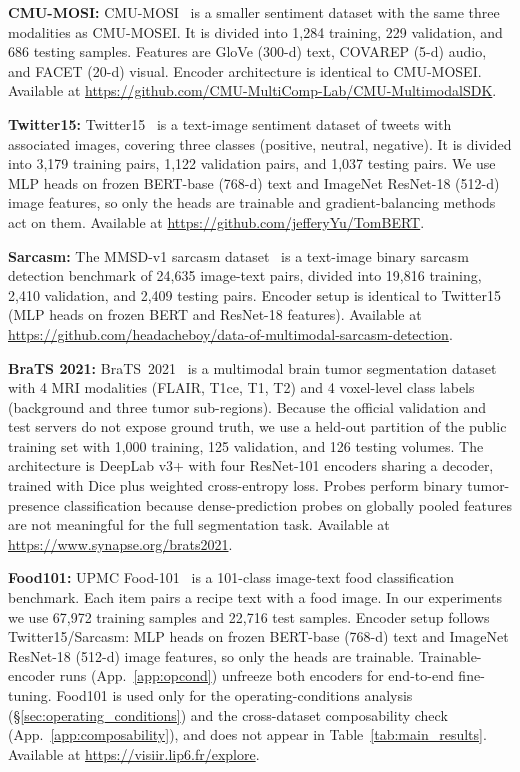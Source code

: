 \documentclass{article} %
\begin{document}
\noindent\textbf{CMU-MOSI:} CMU-MOSI~\citep{zadeh2016mosi} is a smaller sentiment dataset with the same three modalities as CMU-MOSEI. It is divided into 1{,}284 training, 229 validation, and 686 testing samples. Features are GloVe (300-d) text, COVAREP (5-d) audio, and FACET (20-d) visual. Encoder architecture is identical to CMU-MOSEI. Available at \url{https://github.com/CMU-MultiComp-Lab/CMU-MultimodalSDK}.

\noindent\textbf{Twitter15:} Twitter15~\citep{yu2019tombert, zhang2018adaptive} is a text-image sentiment dataset of tweets with associated images, covering three classes (positive, neutral, negative). It is divided into 3{,}179 training pairs, 1{,}122 validation pairs, and 1{,}037 testing pairs. We use MLP heads on frozen BERT-base (768-d) text and ImageNet ResNet-18 (512-d) image features, so only the heads are trainable and gradient-balancing methods act on them. Available at \url{https://github.com/jefferyYu/TomBERT}.

\noindent\textbf{Sarcasm:} The MMSD-v1 sarcasm dataset~\citep{cai2019sarcasm} is a text-image binary sarcasm detection benchmark of 24{,}635 image-text pairs, divided into 19{,}816 training, 2{,}410 validation, and 2{,}409 testing pairs. Encoder setup is identical to Twitter15 (MLP heads on frozen BERT and ResNet-18 features). Available at \url{https://github.com/headacheboy/data-of-multimodal-sarcasm-detection}.

\noindent\textbf{BraTS 2021:} BraTS~2021~\citep{baid2021brats} is a multimodal brain tumor segmentation dataset with 4 MRI modalities (FLAIR, T1ce, T1, T2) and 4 voxel-level class labels (background and three tumor sub-regions). Because the official validation and test servers do not expose ground truth, we use a held-out partition of the public training set with 1{,}000 training, 125 validation, and 126 testing volumes. The architecture is DeepLab v3+ with four ResNet-101 encoders sharing a decoder, trained with Dice plus weighted cross-entropy loss. Probes perform binary tumor-presence classification because dense-prediction probes on globally pooled features are not meaningful for the full segmentation task. Available at \url{https://www.synapse.org/brats2021}.

\noindent\textbf{Food101:} UPMC Food-101~\citep{wang2015upmcfood} is a 101-class image-text food classification benchmark. Each item pairs a recipe text with a food image. In our experiments we use 67{,}972 training samples and 22{,}716 test samples. Encoder setup follows Twitter15/Sarcasm: MLP heads on frozen BERT-base (768-d) text and ImageNet ResNet-18 (512-d) image features, so only the heads are trainable. Trainable-encoder runs (App.~\ref{app:opcond}) unfreeze both encoders for end-to-end fine-tuning. Food101 is used only for the operating-conditions analysis (\S\ref{sec:operating_conditions}) and the cross-dataset composability check (App.~\ref{app:composability}), and does not appear in Table~\ref{tab:main_results}. Available at \url{https://visiir.lip6.fr/explore}.
\end{document}
